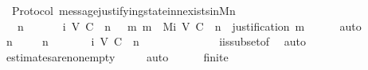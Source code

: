 \begin{isabellebody}
\isanewline
{}\isamarkupfalse%
\ {\isacharparenleft}\ Protocol{\isacharparenright}\ message{\isacharunderscore}justifying{\isacharunderscore}state{\isacharunderscore}in{\isacharunderscore}{\isasymSigma}{\isacharunderscore}n{\isacharunderscore}exists{\isacharunderscore}in{\isacharunderscore}M{\isacharunderscore}n\ {\isacharcolon}\isanewline
\ \ {\isachardoublequoteopen}{\isasymforall}\ n\ {\isasymin}\ {\isasymnat}{\isachardot}\ {\isacharparenleft}{\isasymforall}\ {\isasymsigma}{\isachardot}\ {\isasymsigma}\ {\isasymin}\ {\isasymSigma}i\ {\isacharparenleft}V{\isacharcomma}\ C{\isacharcomma}\ {\isasymepsilon}{\isacharparenright}\ n\ {\isasymlongrightarrow}\ {\isacharparenleft}{\isasymexists}\ m{\isachardot}\ m\ {\isasymin}\ Mi\ {\isacharparenleft}V{\isacharcomma}\ C{\isacharcomma}\ {\isasymepsilon}{\isacharparenright}\ n\ {\isasymand}\ justification\ m\ {\isacharequal}\ {\isasymsigma}{\isacharparenright}{\isacharparenright}{\isachardoublequoteclose}\isanewline
%
\isadelimproof
\ \ %
\endisadelimproof
%
\isatagproof
{}\isamarkupfalse%
\ auto\isanewline
{}\isamarkupfalse%
\ {\isacharminus}\isanewline
\ \ \isamarkupfalse%
\ n\ {\isasymsigma}\isanewline
\ \ \isamarkupfalse%
\ {\isachardoublequoteopen}n\ {\isasymin}\ {\isasymnat}{\isachardoublequoteclose}\isanewline
\ \ \ {\isachardoublequoteopen}{\isasymsigma}\ {\isasymin}\ {\isasymSigma}i\ {\isacharparenleft}V{\isacharcomma}\ C{\isacharcomma}\ {\isasymepsilon}{\isacharparenright}\ n{\isachardoublequoteclose}\isanewline
\ \ \isamarkupfalse%
\ \isamarkupfalse%
\ {\isachardoublequoteopen}{\isasymsigma}\ {\isasymin}\ {\isasymSigma}{\isachardoublequoteclose}\isanewline
\ \ \ \ \isamarkupfalse%
\ {\isasymSigma}i{\isacharunderscore}is{\isacharunderscore}subset{\isacharunderscore}of{\isacharunderscore}{\isasymSigma}\ \isamarkupfalse%
\ auto\isanewline
\ \ \isamarkupfalse%
\ {\isachardoublequoteopen}{\isasymepsilon}\ {\isasymsigma}\ {\isasymnoteq}\ {\isasymemptyset}{\isachardoublequoteclose}\isanewline
\ \ \ \ \isamarkupfalse%
\ estimates{\isacharunderscore}are{\isacharunderscore}non{\isacharunderscore}empty\ {\isacartoucheopen}{\isasymsigma}\ {\isasymin}\ {\isasymSigma}{\isacartoucheclose}\ \isamarkupfalse%
\ auto\ \ \isanewline
\ \ \isamarkupfalse%
\ {\isachardoublequoteopen}finite\ {\isasymsigma}{\isachardoublequoteclose}\ \isanewline
\ \ \ \ \isamarkupfalse%

\end{isabellebody}

